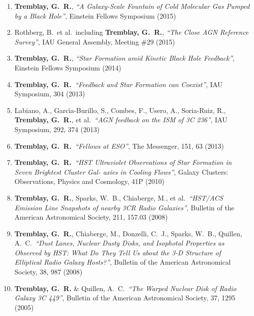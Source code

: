 \documentclass[11pt]{article}
\begin{document}
\begin{enumerate}
\item \textbf{Tremblay, G.~R.}, \textit{``A Galaxy-Scale Fountain of Cold Molecular Gas Pumped by a Black Hole''}, Einstein Fellows Symposium (2015)

\item Rothberg, B.~et al.~including \textbf{Tremblay, G.~R.}, \textit{``The Close AGN Reference Survey''}, IAU General Assembly, Meeting \#29 (2015)


\item \textbf{Tremblay, G.~R.}, \textit{``Star Formation amid Kinetic Black Hole Feedback''}, Einstein Fellows Symposium (2014)


\item \textbf{Tremblay, G.~R.}\  \textit{``Feedback and Star Formation can Coexist''},
IAU Symposium, 304 (2013)


\item Labiano, A., Garc{\'{\i}}a-Burillo, S., Combes, F., Usero, A.,  Soria-Ruiz, R.,  \textbf{Tremblay, G.~R.}, et al.\ \textit{``AGN feedback on the ISM of 3C 236''},
IAU Symposium, 292, 374 (2013)


\item \textbf{Tremblay, G.~R.}\  \textit{``Fellows at ESO''},
The Messenger, 151, 63 (2013)


\item \textbf{Tremblay, G.~R.}\ \textit{``HST Ultraviolet Observations of Star Formation in Seven Brightest Cluster Gal- axies in Cooling Flows''},
Galaxy Clusters: Observations, Physics and Cosmology, 41P (2010)


\item \textbf{Tremblay, G.~R.}, Sparks, W.~B., Chiaberge, M., et al.\ \textit{``HST/ACS Emission Line Snapshots of nearby 3CR Radio Galaxies''},
Bulletin of the American Astronomical Society, 211, 157.03 (2008)



\item \textbf{Tremblay, G.~R.}, Chiaberge, M., Donzelli, C.~J., Sparks, W.~B., Quillen, A.~C.\ \textit{``Dust Lanes, Nuclear Dusty Disks, and Isophotal Properties as Observed by HST: What Do They Tell Us about the 3-D Structure of Elliptical Radio Galaxy Hosts?''},
Bulletin of the American Astronomical Society, 38, 987 (2008)


\item \textbf{Tremblay, G.~R.} \& Quillen, A.~C.\ \textit{``The Warped Nuclear Disk of Radio Galaxy 3C 449''},
Bulletin of the American Astronomical Society, 37, 1295 (2005)

\end{enumerate}
\end{document}
